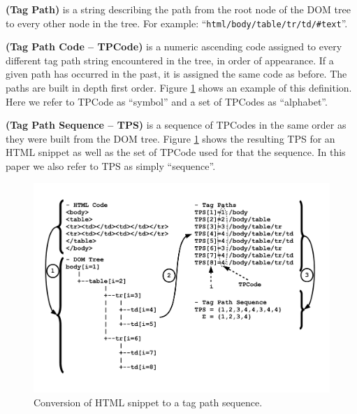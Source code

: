 \begin{definition}\textbf{(Tag Path)} is a string describing the path from the
root node of the DOM tree to every other node in the tree. For example:
``\texttt{html/body/table/tr/td/\#text}''.
\end{definition}

\begin{definition}\textbf{(Tag Path Code -- TPCode)}\label{def:tpc} is a numeric
ascending code assigned to every different tag path string encountered in the
tree, in order of appearance. If a given path has occurred in the past, it is
assigned the same code as before. The paths are built in depth first order.
Figure \ref{fig:tree2seq} shows an example of this definition. Here we refer to
TPCode as ``symbol'' and a set of TPCodes as ``alphabet''.
\end{definition}

\begin{definition}\textbf{(Tag Path Sequence -- TPS)} is a sequence of TPCodes
in the same order as they were built from the DOM tree. Figure
\ref{fig:tree2seq} shows the resulting TPS for an HTML snippet as  well as the
set of TPCode used for that the sequence. In this paper we also refer to TPS as
simply ``sequence''.
\end{definition}

\begin{figure}[h]
  \centering
     \includegraphics[trim={1.0cm 2.0cm 1.5cm 1.0cm}, clip,  width=\columnwidth]{img/tree2seq.pdf}
  \caption{Conversion of HTML snippet to a tag path sequence.}
  \label{fig:tree2seq}
\end{figure}

